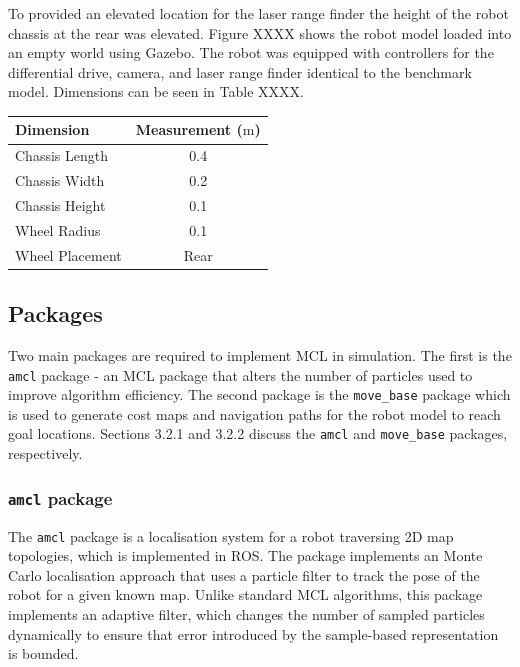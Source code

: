 \documentclass[a4paper]{article}
\begin{document}
\begin{minipage}{0.45\textwidth}
To provided an elevated location for the laser range finder the height of the robot chassis at the rear was elevated. Figure XXXX shows the robot model loaded into an empty world using Gazebo. The robot was equipped with controllers for the differential drive, camera, and laser range finder identical to the benchmark model. Dimensions can be seen in Table XXXX.
\end{minipage}
\hspace{1cm}
\begin{minipage}{0.45\textwidth}
\centering
{}
\begin{tabular}{lc}
\toprule
\textbf{Dimension} & \textbf{Measurement ($\si{\meter}$)} \\
\midrule
Chassis Length & 0.4\\
Chassis Width & 0.2\\
Chassis Height & 0.1\\
Wheel Radius & 0.1\\
Wheel Placement & Rear\\
\bottomrule
\end{tabular}
\end{minipage}

\newpage

\subsection{Packages}
Two main packages are required to implement MCL in simulation. The first is the \texttt{amcl} package - an MCL package that alters the number of particles used to improve algorithm efficiency. The second package is the \texttt{move\_base} package which is used to generate cost maps and navigation paths for the robot model to reach goal locations. Sections 3.2.1 and 3.2.2 discuss the \texttt{amcl} and \texttt{move\_base} packages, respectively.

\subsubsection{\texttt{amcl} package}
The \texttt{amcl} package is a localisation system for a robot traversing 2D map topologies, which is implemented in ROS. The package implements an Monte Carlo localisation approach that uses a particle filter to track the pose of the robot for a given known map. Unlike standard MCL algorithms, this package implements an adaptive filter, which changes the number of sampled particles dynamically to ensure that error introduced by the sample-based representation is bounded.
\end{document}
